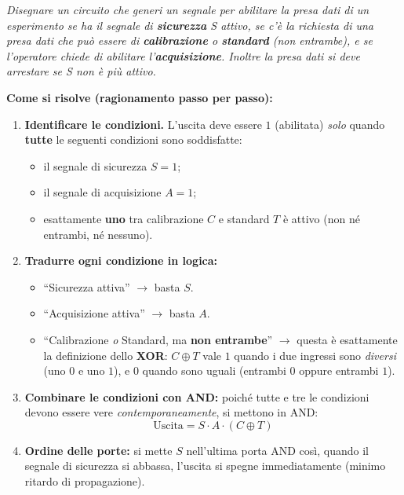 \textit{Disegnare un circuito che generi un segnale per abilitare la presa dati di un esperimento se ha il segnale di \textbf{sicurezza} S attivo, se c'è la richiesta di una presa dati che può essere di \textbf{calibrazione} o \textbf{standard} (non entrambe), e se l'operatore chiede di abilitare l'\textbf{acquisizione}. Inoltre la presa dati si deve arrestare se S non è più attivo.}

\medskip
\noindent\textbf{Come si risolve (ragionamento passo per passo):}

\begin{enumerate}[leftmargin=1.5em]
    \item \textbf{Identificare le condizioni.} L'uscita deve essere $1$ (abilitata) \emph{solo} quando \textbf{tutte} le seguenti condizioni sono soddisfatte:
    \begin{itemize}
        \item il segnale di sicurezza $S = 1$;
        \item il segnale di acquisizione $A = 1$;
        \item esattamente \textbf{uno} tra calibrazione $C$ e standard $T$ è attivo (non né entrambi, né nessuno).
    \end{itemize}
    \item \textbf{Tradurre ogni condizione in logica:}
    \begin{itemize}
        \item ``Sicurezza attiva'' $\rightarrow$ basta $S$.
        \item ``Acquisizione attiva'' $\rightarrow$ basta $A$.
        \item ``Calibrazione \emph{o} Standard, ma \textbf{non entrambe}'' $\rightarrow$ questa è esattamente la definizione dello \textbf{XOR}: $C \oplus T$ vale $1$ quando i due ingressi sono \emph{diversi} (uno $0$ e uno $1$), e $0$ quando sono uguali (entrambi $0$ oppure entrambi $1$).
    \end{itemize}
    \item \textbf{Combinare le condizioni con AND:} poiché tutte e tre le condizioni devono essere vere \emph{contemporaneamente}, si mettono in AND:
    \[
        \text{Uscita} = S \cdot A \cdot (C \oplus T)
    \]
    \item \textbf{Ordine delle porte:} si mette $S$ nell'ultima porta AND così, quando il segnale di sicurezza si abbassa, l'uscita si spegne immediatamente (minimo ritardo di propagazione).
\end{enumerate}

